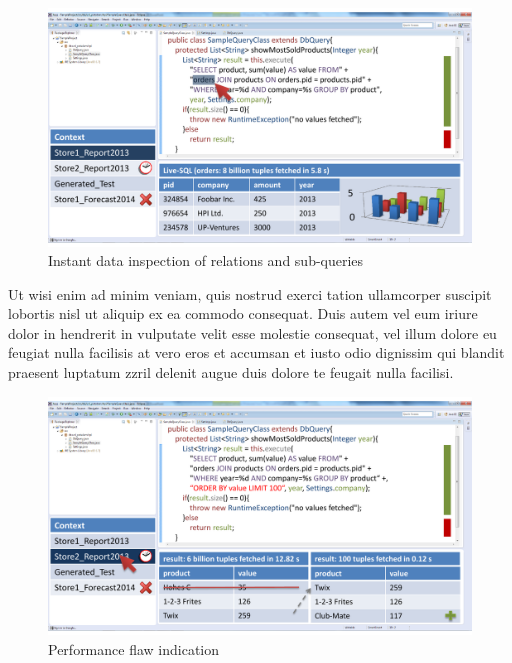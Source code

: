 \begin{figure}
\begin{centering}
    \includegraphics[width=1.0\linewidth]{images/instant}
    \caption{Instant data inspection of relations and sub-queries}
    \label{fig:final_prototype_slow}
\end{centering}
\end{figure}
Ut wisi enim ad minim veniam, quis nostrud exerci tation ullamcorper suscipit lobortis nisl ut aliquip ex ea commodo consequat. Duis autem vel eum iriure dolor in hendrerit in vulputate velit esse molestie consequat, vel illum dolore eu feugiat nulla facilisis at vero eros et accumsan et iusto odio dignissim qui blandit praesent luptatum zzril delenit augue duis dolore te feugait nulla facilisi.   
\begin{figure}
\begin{centering}
    \includegraphics[width=1.0\linewidth]{images/slow}
    \caption{Performance flaw indication}
    \label{fig:final_prototype_slow}
\end{centering}
\end{figure}
